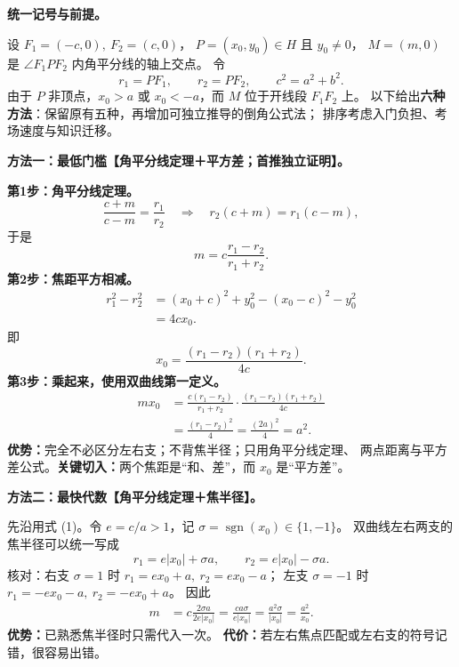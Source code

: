 \clearpage
\begin{proofbox}
\textbf{统一记号与前提。}

设 $F_1=(-c,0),\ F_2=(c,0)$，
$P=(x_0,y_0)\in H$ 且 $y_0\ne0$，
$M=(m,0)$ 是 $\angle F_1PF_2$ 内角平分线的轴上交点。
令
\[
r_1=PF_1,\qquad r_2=PF_2,\qquad c^2=a^2+b^2.
\]
由于 $P$ 非顶点，$x_0>a$ 或 $x_0<-a$，而 $M$ 位于开线段 $F_1F_2$ 上。
以下给出\textbf{六种方法}：保留原有五种，再增加可独立推导的倒角公式法；
排序考虑入门负担、考场速度与知识迁移。

\medskip
\textbf{方法一：最低门槛【角平分线定理＋平方差；首推独立证明】。}


\textbf{第1步：角平分线定理。}
\[
\frac{c+m}{c-m}=\frac{r_1}{r_2}
\quad\Longrightarrow\quad
r_2(c+m)=r_1(c-m),
\]
于是
\[
\boxed{m=c\frac{r_1-r_2}{r_1+r_2}}.\tag{1}
\]
\textbf{第2步：焦距平方相减。}
\[
\begin{aligned}
r_1^2-r_2^2
&=(x_0+c)^2+y_0^2-(x_0-c)^2-y_0^2\\
&=4cx_0.
\end{aligned}
\]
即
\[
\boxed{x_0=\frac{(r_1-r_2)(r_1+r_2)}{4c}}.\tag{2}
\]
\textbf{第3步：乘起来，使用双曲线第一定义。}
\[
\begin{aligned}
mx_0
&=\frac{c(r_1-r_2)}{r_1+r_2}
  \cdot\frac{(r_1-r_2)(r_1+r_2)}{4c}\\
&=\frac{(r_1-r_2)^2}{4}
=\frac{(2a)^2}{4}=\boxed{a^2}.
\end{aligned}
\]
\textbf{优势：}完全不必区分左右支；不背焦半径；只用角平分线定理、
两点距离与平方差公式。\textbf{关键切入：}两个焦距是“和、差”，而 $x_0$ 是“平方差”。

\medskip
\end{proofbox}
\clearpage
\begin{proofbox}
\textbf{方法二：最快代数【角平分线定理＋焦半径】。}

先沿用式 (1)。令 $e=c/a>1$，记
$\sigma=\operatorname{sgn}(x_0)\in\{1,-1\}$。
双曲线左右两支的焦半径可以统一写成
\[
\boxed{r_1=e|x_0|+\sigma a,\qquad
r_2=e|x_0|-\sigma a}.
\]
核对：右支 $\sigma=1$ 时 $r_1=ex_0+a,\ r_2=ex_0-a$；
左支 $\sigma=-1$ 时 $r_1=-ex_0-a,\ r_2=-ex_0+a$。
因此
\[
\begin{aligned}
m
&=c\frac{2\sigma a}{2e|x_0|}
=\frac{ca\sigma}{e|x_0|}
=\frac{a^2\sigma}{|x_0|}
=\boxed{\frac{a^2}{x_0}}.
\end{aligned}
\]
\textbf{优势：}已熟悉焦半径时只需代入一次。
\textbf{代价：}若左右焦点匹配或左右支的符号记错，很容易出错。

\medskip
\end{proofbox}
